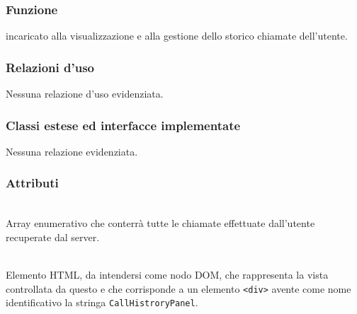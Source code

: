 


\subsubsection*{Funzione}
 incaricato alla visualizzazione e alla gestione dello storico chiamate dell'utente.

\subsubsection*{Relazioni d'uso}
Nessuna relazione d'uso evidenziata.

\subsubsection*{Classi estese ed interfacce implementate}
Nessuna relazione evidenziata.

\subsubsection*{Attributi}
\begin{description}
  \item{}\\
  Array enumerativo che conterrà tutte le chiamate effettuate dall'utente recuperate dal server.
  \item{}\\
  Elemento HTML, da intendersi come nodo DOM, che rappresenta la vista controllata da questo  e che corrisponde a un elemento \verb'<div>' avente come nome identificativo la stringa \verb'CallHistroryPanel'.
\end{description}

